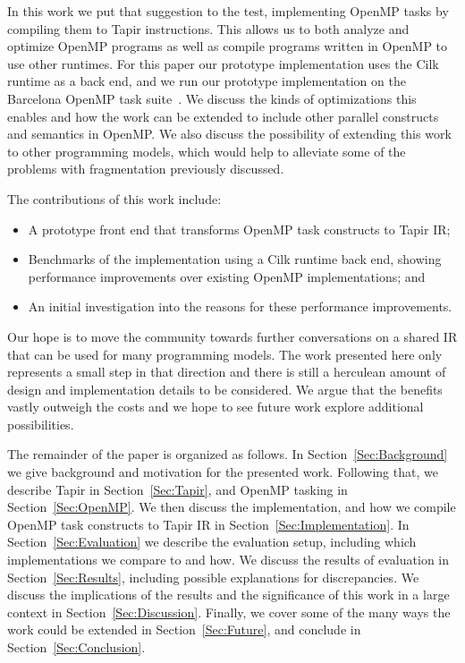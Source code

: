 \documentclass[sigconf]{acmart}
\begin{document}
In this work we put that suggestion to the test, implementing OpenMP tasks by
compiling them to Tapir instructions. This allows us to both analyze and optimize
OpenMP programs as well as compile programs written in OpenMP to use other runtimes.
For this paper our prototype implementation uses the Cilk runtime as a back end,
and we run our prototype implementation on the Barcelona OpenMP task
suite~\cite{barcelona}.  We discuss the kinds of optimizations this enables and
how the work can be extended to include other parallel constructs and semantics
in OpenMP. We also discuss the possibility of extending this work to other
programming models, which would help to alleviate some of the problems with
fragmentation previously discussed.

The contributions of this work include:
\begin{itemize}
  \item A prototype front end that transforms OpenMP task constructs to Tapir IR;
  \item Benchmarks of the implementation using a Cilk runtime back end, showing
        performance improvements over existing OpenMP implementations; and
  \item An initial investigation into the reasons for these performance improvements.
\end{itemize}
Our hope is to move the community towards further conversations on a
shared IR that can be used for many programming models. The work presented here only
represents a small step in that direction and there is still a herculean amount
of design and implementation details to be considered. We argue that the benefits vastly outweigh
the costs and we hope to see future work explore additional possibilities.


The remainder of the paper is organized as follows.  In
Section~\ref{Sec:Background} we give background and motivation for the
presented work. Following that, we describe Tapir in Section~\ref{Sec:Tapir},
and OpenMP tasking in Section~\ref{Sec:OpenMP}.  We then discuss the
implementation, and how we compile OpenMP task constructs to Tapir IR in
Section~\ref{Sec:Implementation}. In Section~\ref{Sec:Evaluation} we describe
the evaluation setup, including which implementations we compare to and
how. We discuss the results of evaluation in Section~\ref{Sec:Results},
including possible explanations for discrepancies. We discuss the implications
of the results and the significance of this work in a large context
in Section~\ref{Sec:Discussion}. Finally, we cover some of the many ways the work
could be extended in Section~\ref{Sec:Future}, and conclude in
Section~\ref{Sec:Conclusion}.
\end{document}
